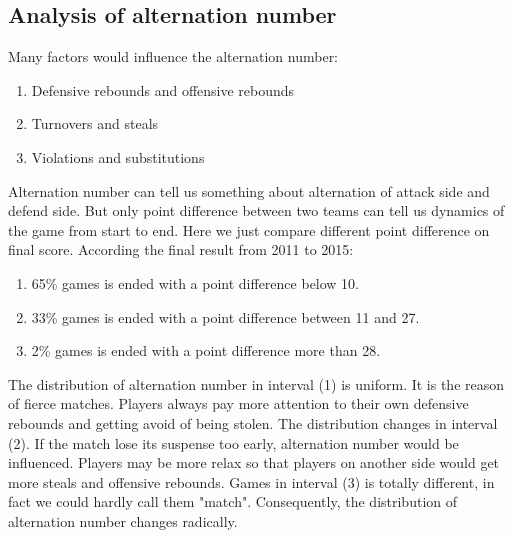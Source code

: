 \documentclass[sigconf]{acmart}
\begin{document}
\subsection{Analysis of alternation number}
Many factors would influence the alternation number:\\
\begin{enumerate}
    \item Defensive rebounds and offensive rebounds
    \item Turnovers and steals
    \item Violations and substitutions
\end{enumerate}
Alternation number can tell us something about alternation of attack side and defend side. But only point difference between two teams can tell us dynamics of the game from start to end. Here we just compare different point difference on final score. According the final result from 2011 to 2015:
\begin{enumerate}
    \item 65\% games is ended with a point difference below 10.
    \item 33\% games is ended with a point difference between 11 and 27.
    \item 2\% games is ended with a point difference more than 28.
\end{enumerate}
The distribution of alternation number in interval (1) is uniform. It is the reason of fierce matches. Players always pay more attention to their own defensive rebounds and getting avoid of being stolen. The distribution changes in interval (2). If the match lose its suspense too early, alternation number would be influenced. Players may be more relax so that players on another side would get more steals and offensive rebounds. Games in interval (3) is totally different, in fact we could hardly call them "match". Consequently, the distribution of alternation number changes radically. 
\end{document}
